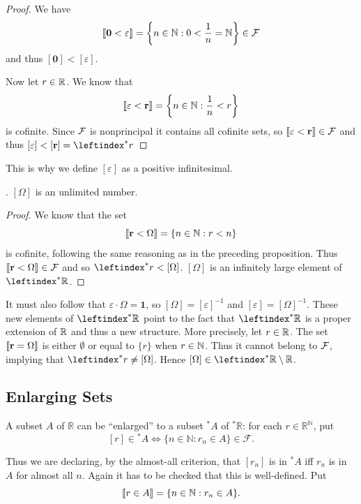 \begin{proof}
    We have
    $$
    \llbracket \textbf{0} < \varepsilon \rrbracket = \left\{ n \in \mathbb{N} : 0 <\frac{1}{n} = \mathbb{N}  \right\}\in \mathcal{F}
    $$
    and thus $[\textbf{0}] < [\varepsilon]$.

    Now let $r \in \mathbb{R}$. We know that
    $$
    \llbracket \varepsilon <\textbf{r} \rrbracket = \left\{ n\in \mathbb{N} : \frac{1}{n} < r \right\}
    $$
    is cofinite. Since $\mathcal{F}$ is nonprincipal it contains all cofinite sets, so $\llbracket \varepsilon <\textbf{r} \rrbracket \in \mathcal{F}$ and thus $[\varepsilon] <[\textbf{r}]=\leftindex^* r$
\end{proof}
This is why we define $[\varepsilon]$ as a positive infinitesimal. 

. $[\Omega]$ is an unlimited number.


\begin{proof}
    We know that the set 
    $$
    \llbracket \textbf{r} < \Omega \rrbracket = \left\{ n \in \mathbb{N} : r < n \right\}
    $$
    is cofinite, following the same reasoning as in the preceding proposition. Thus $\llbracket \textbf{r} < \Omega \rrbracket \in \mathcal{F}$ and so $\leftindex^* r <[\Omega]$. $[\Omega]$ is an infinitely large element of $\Rns$.
\end{proof}

It must also follow that $\varepsilon \cdot \Omega =\textbf{1}$, so $[\Omega]=[\varepsilon]^{-1}$ and $[\varepsilon]=[\Omega]^{-1}$. These new elements of $\Rns$ point to the fact that $\Rns$ is a proper extension of $\mathbb{R}$ and thus a new structure. More precisely, let $r \in \mathbb{R}$. The set $\llbracket \textbf{r} =\Omega \rrbracket$ is either $\emptyset$ or equal to $\{r\}$ when $r \in \mathbb{N}$. Thus it cannot belong to $\mathcal{F}$, implying that $\leftindex^* r \neq [\Omega]$. Hence $[\Omega] \in \Rns \setminus \Rs$.

\subsection{Enlarging Sets}
A subset $A$ of $\mathbb{R}$ can be ``enlarged'' to a subset ${}^*A$ of ${}^*\mathbb{R}$: for each $r \in \mathbb{R}^{\mathbb{N}}$, put
\[
[ r] \in {}^*A \iff \{n \in \mathbb{N} : r_n \in A\} \in \mathcal{F}.
\]

Thus we are declaring, by the almost-all criterion, that $[r_n]$ is in ${}^*A$ iff $r_n$ is in $A$ for almost all $n$. Again it has to be checked that this is well-defined. Put
\[
\llbracket r \in A\rrbracket = \{n \in \mathbb{N} : r_n \in A\}.
\]

